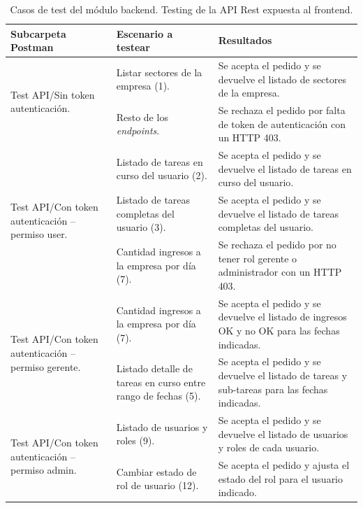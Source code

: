 \begin{table}[h]
	\centering
	\caption[Tipos de pruebas backend]{Casos de test del módulo backend. Testing de la API Rest expuesta al frontend.}
	\begin{tabular}{p{3.5cm} p{3.5cm} p{5cm}} 	

		\toprule
		\textbf{Subcarpeta Postman} & 
		\textbf{Escenario a testear} &
		\textbf{Resultados} 
		\\
		\midrule

\multirow{2}{3.5cm}{Test API/Sin token autenticación.} & Listar sectores de la empresa (1). & Se acepta el pedido y se devuelve el listado de sectores de la empresa. \\
                    & Resto de los \textit{endpoints}. & Se rechaza el pedido por falta de token de autenticación con un HTTP 403. \\
\hline
\multirow{3}{3.5cm}{Test API/Con token autenticación – permiso user.} & Listado de tareas en curso del usuario (2). & Se acepta el pedido y se devuelve el listado de tareas en curso del usuario. \\
                    & Listado de tareas completas del usuario (3). & Se acepta el pedido y se devuelve el listado de tareas completas del usuario. \\
                    & Cantidad ingresos a la empresa por día (7). & Se rechaza el pedido por no tener rol gerente o administrador con un HTTP 403. \\
\hline
\multirow{2}{3.5cm}{Test API/Con token autenticación – permiso gerente.}  & Cantidad ingresos a la empresa por día (7). & Se acepta el pedido y se devuelve el listado de ingresos OK y no OK para las fechas indicadas. \\
                    & Listado detalle de tareas en curso entre rango de fechas (5). & Se acepta el pedido y se devuelve el listado de tareas y sub-tareas para las fechas indicadas. \\
\hline
\multirow{2}{3.5cm}{Test API/Con token autenticación – permiso admin.}  & Listado de usuarios y roles (9). & Se acepta el pedido y se devuelve el listado de usuarios y roles de cada usuario. \\
                    & Cambiar estado de rol de usuario (12). & Se acepta el pedido y ajusta el estado del rol para el usuario indicado. \\
		\bottomrule
		\hline
	\end{tabular}
	\label{tab:tablaTestBackendFrontend}
\end{table}

